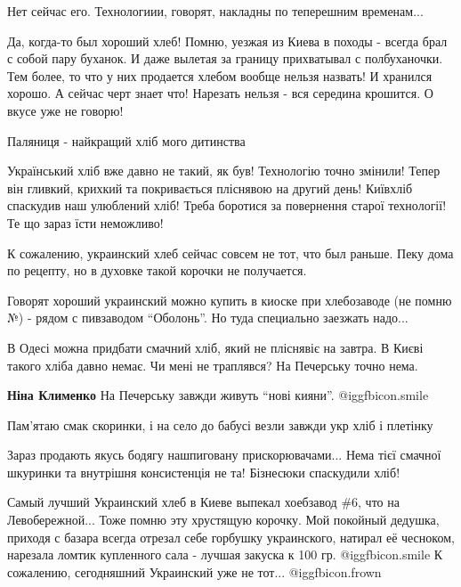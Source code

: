 \begin{itemize}
\begin{itemize}
\end{itemize} %

Нет сейчас его. Технологиии, говорят, накладны по теперешним временам...


Да, когда-то был хороший хлеб! Помню, уезжая из Киева в походы - всегда брал с
собой пару буханок. И даже вылетая за границу прихватывал с полбуханочки. Тем
более, то что у них продается хлебом вообще нельзя назвать! И хранился хорошо.
А сейчас черт знает что! Нарезать нельзя - вся середина крошится. О вкусе уже
не говорю!


Паляниця - найкращий хліб мого дитинства


Український хліб вже давно не такий, як був! Технологію точно змінили! Тепер
він гливкий, крихкий та покривається пліснявою на другий день! Київхліб
спаскудив наш улюблений хліб! Треба боротися за повернення старої технології!
Те що зараз їсти неможливо!



К сожалению, украинский хлеб сейчас совсем не тот, что был раньше. Пеку дома по
рецепту, но в духовке такой корочки не получается.


Говорят хороший украинский можно купить в киоске при хлебозаводе (не помню №) -
рядом с пивзаводом \enquote{Оболонь}. Но туда специально заезжать надо...


В Одесі можна придбати смачний хліб, який не пліснявіє на завтра. В Києві
такого хліба давно немає. Чи мені не траплявся? На Печерську точно нема.

\begin{itemize} %
\textbf{Ніна Клименко} На Печерську завжди живуть \enquote{нові кияни}.  @igg{fbicon.smile} 
\end{itemize} %

Пам'ятаю смак скоринки, і на село до бабусі везли завжди укр хліб і плетінку

Зараз продають якусь бодягу нашпиговану прискорювачами... Нема тієї смачної шкуринки та внутрішня консистенція не та! Бізнесюки спаскудили хліб!

Самый лучший Украинский хлеб в Киеве выпекал хоебзавод \#6, что на Левобережной...
Тоже помню эту хрустящую корочку.
Мой покойный дедушка, приходя с базара всегда отрезал себе горбушку украинского, натирал её чесноком, нарезала ломтик купленного сала - лучшая закуска к 100 гр.
 @igg{fbicon.smile} 
К сожалению, сегодняшний Украинский уже не тот...
 @igg{fbicon.frown} 


\end{itemize}
